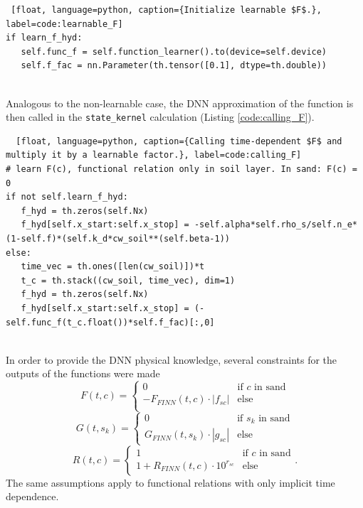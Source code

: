\begin{lstlisting} [float, language=python, caption={Initialize learnable $F$.}, label=code:learnable_F]
if learn_f_hyd:
   self.func_f = self.function_learner().to(device=self.device)
   self.f_fac = nn.Parameter(th.tensor([0.1], dtype=th.double))
\end{lstlisting}
\\
Analogous to the non-learnable case, the DNN approximation of the function is then called in the \texttt{state\_kernel} calculation (Listing \ref{code:calling_F}).
\begin{lstlisting}  [float, language=python, caption={Calling time-dependent $F$ and multiply it by a learnable factor.}, label=code:calling_F]
# learn F(c), functional relation only in soil layer. In sand: F(c) = 0
if not self.learn_f_hyd:
   f_hyd = th.zeros(self.Nx)
   f_hyd[self.x_start:self.x_stop] = -self.alpha*self.rho_s/self.n_e*(1-self.f)*(self.k_d*cw_soil**(self.beta-1))    
else:
   time_vec = th.ones([len(cw_soil)])*t
   t_c = th.stack((cw_soil, time_vec), dim=1)
   f_hyd = th.zeros(self.Nx)
   f_hyd[self.x_start:self.x_stop] = (-self.func_f(t_c.float())*self.f_fac)[:,0]
\end{lstlisting}
\\
In order to provide the DNN physical knowledge, several constraints for the outputs of the functions were made
\begin{equation}
F(t, c) = \begin{cases} 
      0 & \text{if $c$ in sand}\\
      -F_{FINN}(t,c)\cdot|f_{sc}| & \text{else}\\
   \end{cases}
   \label{eq:F}
\end{equation}
\begin{equation}
G(t,s_k) = \begin{cases}
0 & \text{if $s_k$ in sand} \\
G_{FINN}(t, s_k) \cdot |g_{sc}| & \text{else} 
\end{cases}
\label{eq:G}
\end{equation}
\begin{equation}
R(t,c) = \begin{cases}
1 & \text{if $c$ in sand}\\
1+R_{FINN}(t,c)\cdot 10^{r_{sc}} & \text{else}
\end{cases}.
\label{eq:R}
\end{equation}
The same assumptions apply to functional relations with only implicit time dependence.\\
